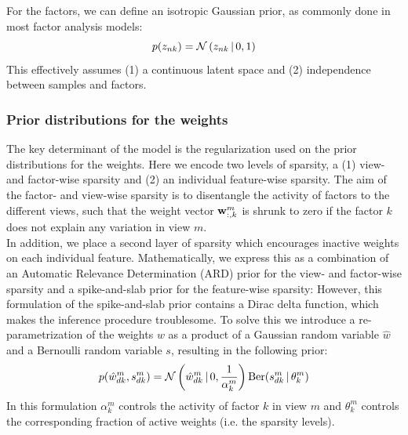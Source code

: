For the factors, we can define an isotropic Gaussian prior, as commonly done in most factor analysis models:
\begin{equation}
	p(z_{nk}) = \mathcal{N}\left(z_{nk} \,|\, 0,1\right)
\end{equation}
This effectively  assumes (1) a continuous latent space and (2) independence between samples and factors. 

\subsubsection{Prior distributions for the weights}  \label{section:mofa_weights}

The key determinant of the model is the regularization used on the prior distributions for the weights. Here we encode two levels of sparsity, a (1) view- and factor-wise sparsity and (2) an individual feature-wise sparsity. The aim of the factor- and view-wise sparsity is to disentangle the activity of factors to the different views, such that the weight vector ${\bf w}_{:,k}^m$ is shrunk to zero if the factor $k$ does not explain any variation in view $m$. \\
In addition, we place a second layer of sparsity which encourages inactive weights on each individual feature. Mathematically, we express this as a combination of an Automatic Relevance Determination (ARD) prior \cite{Mackay1996} for the view- and factor-wise sparsity and a spike-and-slab prior \cite{Mitchell1988} for the feature-wise sparsity:
However, this formulation of the spike-and-slab prior contains a Dirac delta function, which makes the inference procedure troublesome. To solve this we introduce a re-parametrization of the weights $w$ as a product of a Gaussian random variable $\hat{w}$ and a Bernoulli random variable $s$, \cite{Titsias2011} resulting in the following prior:
\begin{equation}
	p(\hat{w}_{dk}^{m},s_{dk}^{m}) = \mathcal{N}\left(\hat{w}_{dk}^{m} \,|\, 0, \frac{1}{\alpha_k^m}\right)  \text{Ber}(s_{dk}^m \,|\,\theta_k^m)
\end{equation}
In this formulation $\alpha_k^m$ controls the activity of factor $k$ in view $m$ and $\theta_k^m$ controls the corresponding fraction of active weights (i.e. the sparsity levels).\\

